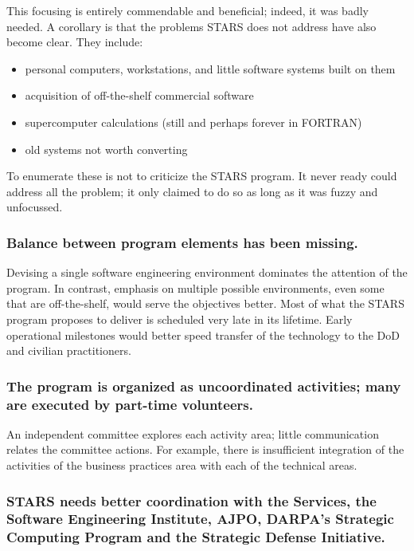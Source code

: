 \documentclass[12pt]{article}
\begin{document}
This focusing is entirely commendable and beneficial; indeed, it was badly
needed. A corollary is that the problems STARS does not address have also
become clear. They include:

\begin{itemize}
    \item personal computers, workstations, and little software systems built on them
    \item acquisition of off-the-shelf commercial software
    \item supercomputer calculations (still and perhaps forever in FORTRAN)
    \item old systems not worth converting
\end{itemize}

To enumerate these is not to criticize the STARS program. It never ready could
address all the problem; it only claimed to do so as long as it was fuzzy and
unfocussed.

\subsubsection*{Balance between program elements has been missing.}

Devising a single software engineering environment dominates the attention of
the program. In contrast, emphasis on multiple possible environments, even some
that are off-the-shelf, would serve the objectives better. Most of what the
STARS program proposes to deliver is scheduled very late in its lifetime. Early
operational milestones would better speed transfer of the technology to the DoD
and civilian practitioners.

\subsubsection*{The program is organized as uncoordinated activities; many are executed
by part-time volunteers.}

An independent committee explores each activity area; little communication
relates the committee actions. For example, there is insufficient integration
of the activities of the business practices area with each of the technical
areas.

\subsubsection*{STARS needs better coordination with the Services, the Software
Engineering Institute, AJPO, DARPA's Strategic Computing Program and the
Strategic Defense Initiative.}
\end{document}
